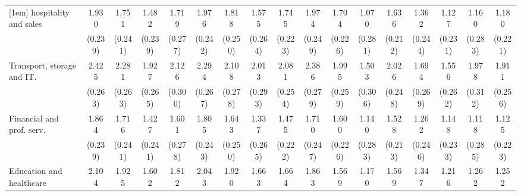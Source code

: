{\begin{tabular}{l*{16}{c}}
[1em]
hospitality and sales&       1.930\sym{***}&       1.751\sym{***}&       1.482\sym{***}&       1.719\sym{***}&       1.976\sym{***}&       1.818\sym{***}&       1.575\sym{***}&       1.745\sym{***}&       1.974\sym{***}&       1.704\sym{***}&       1.070\sym{***}&       1.636\sym{***}&       1.362\sym{***}&       1.127\sym{***}&       1.160\sym{***}&       1.180\sym{***}\\
                    &     (0.239)         &     (0.241)         &     (0.239)         &     (0.277)         &     (0.242)         &     (0.250)         &     (0.264)         &     (0.223)         &     (0.249)         &     (0.226)         &     (0.281)         &     (0.212)         &     (0.244)         &     (0.231)         &     (0.283)         &     (0.221)         \\
[1em]
Transport, storage and IT.&       2.425\sym{***}&       2.281\sym{***}&       1.927\sym{***}&       2.126\sym{***}&       2.294\sym{***}&       2.108\sym{***}&       2.013\sym{***}&       2.081\sym{***}&       2.386\sym{***}&       1.995\sym{***}&       1.503\sym{***}&       2.026\sym{***}&       1.694\sym{***}&       1.556\sym{***}&       1.978\sym{***}&       1.911\sym{***}\\
                    &     (0.263)         &     (0.263)         &     (0.265)         &     (0.300)         &     (0.267)         &     (0.278)         &     (0.293)         &     (0.254)         &     (0.279)         &     (0.259)         &     (0.306)         &     (0.248)         &     (0.269)         &     (0.262)         &     (0.312)         &     (0.256)         \\
[1em]
Financial and prof. serv.&       1.864\sym{***}&       1.716\sym{***}&       1.427\sym{***}&       1.601\sym{***}&       1.805\sym{***}&       1.643\sym{***}&       1.337\sym{***}&       1.475\sym{***}&       1.710\sym{***}&       1.600\sym{***}&       1.140\sym{***}&       1.528\sym{***}&       1.262\sym{***}&       1.148\sym{***}&       1.118\sym{***}&       1.125\sym{***}\\
                    &     (0.239)         &     (0.241)         &     (0.241)         &     (0.278)         &     (0.243)         &     (0.250)         &     (0.265)         &     (0.222)         &     (0.247)         &     (0.226)         &     (0.283)         &     (0.213)         &     (0.246)         &     (0.233)         &     (0.285)         &     (0.223)         \\
[1em]
Education and healthcare&       2.104\sym{***}&       1.925\sym{***}&       1.602\sym{***}&       1.812\sym{***}&       2.043\sym{***}&       1.920\sym{***}&       1.663\sym{***}&       1.664\sym{***}&       1.863\sym{***}&       1.569\sym{***}&       1.170\sym{***}&       1.569\sym{***}&       1.347\sym{***}&       1.216\sym{***}&       1.262\sym{***}&       1.252\sym{***}\\

\end{tabular}}
